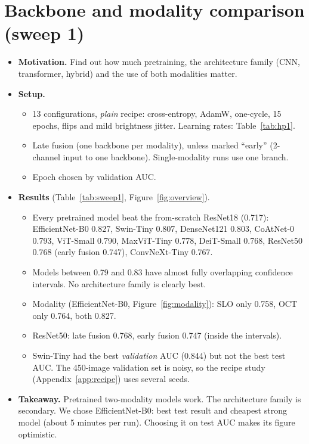 \documentclass[11pt]{article}
\begin{document}
\section{Backbone and modality comparison (sweep 1)}\label{app:backbones}
\begin{itemize}
\item \textbf{Motivation.} Find out how much pretraining, the architecture family (CNN, transformer, hybrid) and the use of both modalities matter.
\item \textbf{Setup.}
  \begin{itemize}
  \item 13 configurations, \emph{plain} recipe: cross-entropy, AdamW, one-cycle, 15 epochs, flips and mild brightness jitter. Learning rates: Table~\ref{tab:hp1}.
  \item Late fusion (one backbone per modality), unless marked ``early'' (2-channel input to one backbone). Single-modality runs use one branch.
  \item Epoch chosen by validation AUC.
  \end{itemize}
\item \textbf{Results} (Table~\ref{tab:sweep1}, Figure~\ref{fig:overview}).
  \begin{itemize}
  \item Every pretrained model beat the from-scratch ResNet18 (0.717): EfficientNet-B0 0.827, Swin-Tiny 0.807, DenseNet121 0.803, CoAtNet-0 0.793, ViT-Small 0.790, MaxViT-Tiny 0.778, DeiT-Small 0.768, ResNet50 0.768 (early fusion 0.747), ConvNeXt-Tiny 0.767.
  \item Models between 0.79 and 0.83 have almost fully overlapping confidence intervals. No architecture family is clearly best.
  \item Modality (EfficientNet-B0, Figure~\ref{fig:modality}): SLO only 0.758, OCT only 0.764, both 0.827.
  \item ResNet50: late fusion 0.768, early fusion 0.747 (inside the intervals).
  \item Swin-Tiny had the best \emph{validation} AUC (0.844) but not the best test AUC. The 450-image validation set is noisy, so the recipe study (Appendix~\ref{app:recipe}) uses several seeds.
  \end{itemize}
\item \textbf{Takeaway.} Pretrained two-modality models work. The architecture family is secondary. We chose EfficientNet-B0: best test result and cheapest strong model (about 5 minutes per run). Choosing it on test AUC makes its figure optimistic.
\end{itemize}
\end{document}

